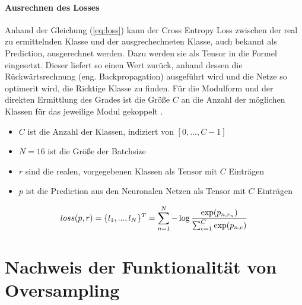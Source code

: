 \vspace{-0.3cm}

\paragraph{Ausrechnen des Losses} Anhand der Gleichung (\ref{eq:loss}) kann der Cross Entropy Loss zwischen der real zu ermittelnden Klasse und der ausgrechechneten Klasse, auch bekannt als Prediction, ausgerechnet werden. Dazu werden sie als Tensor in die Formel eingesetzt. Dieser liefert so einen Wert zurück, anhand dessen die Rückwärtsrechnung (eng. Backpropagation) ausgeführt wird und die Netze so optimerit wird, die Ricktige Klasse zu finden. Für die Modulform und der direkten Ermittlung des Grades ist die Größe $C$ an die Anzahl der möglichen Klassen für das jeweilige Modul gekoppelt \cite{pytorch}.


\begin{itemize}
  \setlength\itemsep{-0.5em}
\item $C$ ist die Anzahl der Klassen, indiziert von $[0, ..., C-1]$
\item $N = 16$ ist die Größe der Batchsize
\item $r$ sind die realen, vorgegebenen Klassen als Tensor mit $C$ Einträgen
\item $p$ ist die Prediction aus den Neuronalen Netzen als Tensor mit $C$ Einträgen
\end{itemize}

\begin{equation}\centering
loss(p, r) = \{l_1, ... ,l_N\}^T = \sum_{n=1}^N {- \log \frac{\exp(p_{n,r_n})}{\sum_{c=1}^C \exp(p_{n,c})}}
\label{eq:loss}
\end{equation}













\clearpage
\section{Nachweis der Funktionalität von Oversampling}\label{oversampling}


